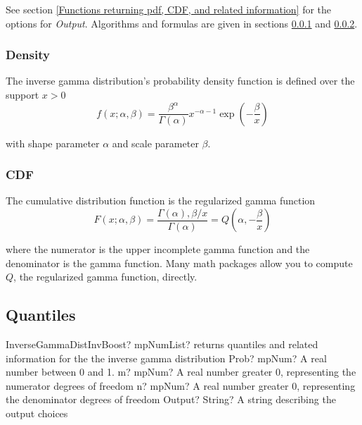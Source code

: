 \vspace{0.3cm}
See section \ref{Functions returning pdf, CDF, and related information} for the options for {\itshape\sffamily Output}. Algorithms and formulas are given in sections \ref{InverseGammaDistributionDensity} and \ref{InverseGammaDistributionCDF}.


\subsubsection{Density}
\label{InverseGammaDistributionDensity}

The inverse gamma distribution's probability density function is defined over the support $x>0$
\begin{equation} 
	f(x;\alpha,\beta)= \frac{\beta^{\alpha}}{\Gamma(\alpha)} x^{-\alpha-1} \exp \left(-\frac{\beta}{x} \right)
\end{equation}


with shape parameter $\alpha$ and scale parameter $\beta$.



\subsubsection{CDF}
\label{InverseGammaDistributionCDF}
The cumulative distribution function is the regularized gamma function
\begin{equation} 
	F(x;\alpha,\beta)= \frac{\Gamma(\alpha),\beta/x}{\Gamma(\alpha)} = Q \left(\alpha, -\frac{\beta}{x} \right)
\end{equation}


where the numerator is the upper incomplete gamma function and the denominator is the gamma function. Many math packages allow you to compute $Q$, the regularized gamma function, directly.




\subsection{Quantiles}

\begin{mpFunctionsExtract}
	\mpFunctionFour
	{InverseGammaDistInvBoost? mpNumList? returns quantiles and related information for the the inverse gamma distribution}
	{Prob? mpNum? A real number between 0 and 1.}
	{m? mpNum? A real number greater 0, representing the numerator  degrees of freedom}
	{n? mpNum? A real number greater 0, representing the denominator degrees of freedom}
	{Output? String? A string describing the output choices}
\end{mpFunctionsExtract}


